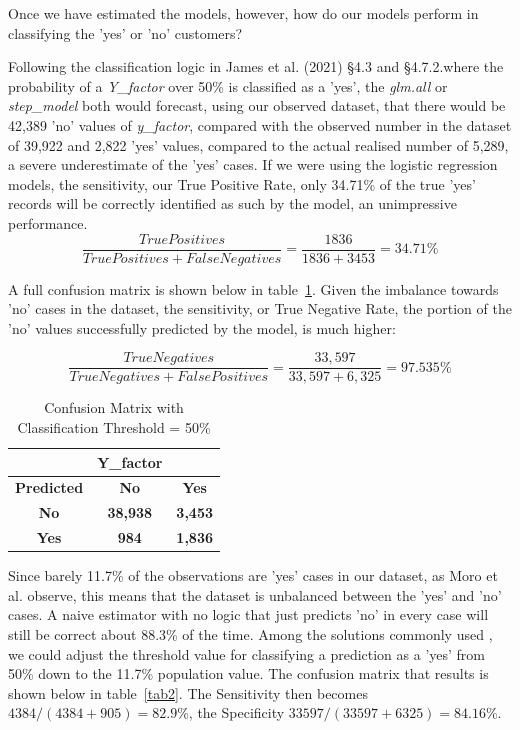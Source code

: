 \documentclass[9pt,technote]{IEEEtran}
\begin{document}
Once we have estimated the models, however, how do our models perform in classifying the 'yes' or 'no' customers?      
  
Following the classification logic in James et al. (2021) \cite{hastie21} \S 4.3 and \S 4.7.2.where the probability of a \textit{Y\_factor} over 50\% is classified as a 'yes', the \textit{glm.all} or \textit{step\_model} both would forecast, using our observed dataset, that there would be 42,389 'no' values of \textit{y\_factor}, compared with the observed number in the dataset of 39,922 and 2,822 'yes' values, compared to the actual realised number of 5,289, a severe underestimate of the 'yes' cases.  If we were using the logistic regression models, the sensitivity, our True Positive Rate, only 34.71\% of the true  'yes' records will be correctly identified as such by the model, an unimpressive performance. 
\begin{equation}
\frac{True Positives}{True Positives + False Negatives} = \frac{1836}{1836+3453} = 34.71\%
\end{equation}

A full confusion matrix is shown below in table~\ref{tab1}.  Given the imbalance towards 'no' cases in the dataset, the sensitivity, or True Negative Rate, the portion of the 'no' values successfully predicted by the model, is much higher: 

\begin{equation}
\frac{True Negatives}{True Negatives + False Positives} = \frac{33,597}{33,597+6,325} = 97.535\%
\end{equation}

\begin{table}[htbp]
\begin{center}
\begin{tabular}{|c|c|c|}
\hline
& \textbf{Y\_factor}&\\
\hline
\textbf{Predicted}&{\textbf{No}}&{\textbf{Yes}} \\
\hline
\textbf{No}&{\textbf{38,938}}&{\textbf{3,453}} \\
\hline
\textbf{Yes}&{\textbf{984}}&{\textbf{1,836}} \\
\hline
\end{tabular}
\label{tab1}
\caption{Confusion Matrix with Classification Threshold = 50\%}
\end{center}
\end{table}

Since barely 11.7\% of the observations are 'yes' cases in our dataset, as Moro et al. observe, this means that the dataset is unbalanced between the 'yes' and 'no' cases.  A naive estimator with no logic that just predicts 'no' in every case will still be correct about 88.3\% of the time.  Among the solutions commonly used \cite{branco17}, we could adjust the threshold value for classifying a prediction as a 'yes' from 50\% down to the 11.7\% population value.  The confusion matrix that results is shown below in table~\ref{tab2}.  The Sensitivity then becomes $4384/(4384+905) = 82.9\%$, the Specificity $33597 / (33597 + 6325) = 84.16\%$.  
\end{document}
